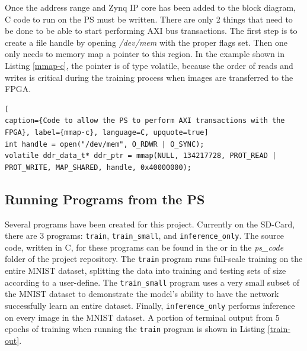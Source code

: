 Once the address range and Zynq IP core has been added to the block diagram, C code to run on the PS must be written. There are only 2 things that need to be done to be able to start performing AXI bus transactions. The first step is to create a file handle by opening \textit{/dev/mem} with the proper flags set. Then one only needs to memory map a pointer to this region. In the example shown in Listing \ref{mmap-c}, the pointer is of type volatile, because the order of reads and writes is critical during the training process when images are transferred to the FPGA.
\begin{lstlisting}[
caption={Code to allow the PS to perform AXI transactions with the FPGA}, label={mmap-c}, language=C, upquote=true]
int handle = open("/dev/mem", O_RDWR | O_SYNC); 
volatile ddr_data_t* ddr_ptr = mmap(NULL, 134217728, PROT_READ | PROT_WRITE, MAP_SHARED, handle, 0x40000000);
\end{lstlisting}

\subsection{Running Programs from the PS}
Several programs have been created for this project. Currently on the SD-Card, there are 3 programs: \texttt{train}, \texttt{train\_small}, and \texttt{inference\_only}. The source code, written in C, for these programs can be found in the  or in the \textit{ps\_code} folder of the project repository. The \texttt{train} program runs full-scale training on the entire MNIST dataset, splitting the data into training and testing sets of size according to a user-define. The \texttt{train\_small} program uses a very small subset of the MNIST dataset to demonstrate the model's ability to have the network successfully learn an entire dataset. Finally, \texttt{inference\_only} performs inference on every image in the MNIST dataset. A portion of terminal output from 5 epochs of training when running  the \texttt{train} program is shown in Listing \ref{train-out}.

